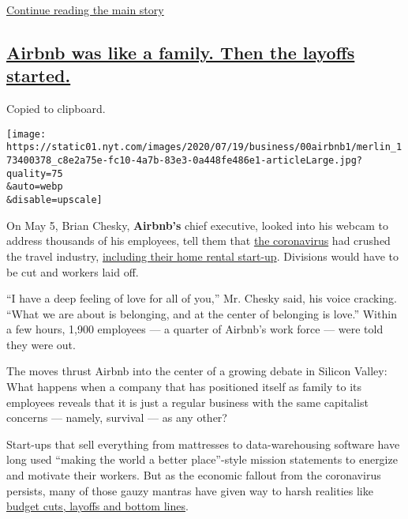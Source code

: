 \protect\hyperlink{after-dfp-ad-mid3}{Continue reading the main story}

\hypertarget{airbnb-was-like-a-family-then-the-layoffs-started}{%
\subsection{\texorpdfstring{\protect\hyperlink{airbnb-was-like-a-family-then-the-layoffs-started}{Airbnb
was like a family. Then the layoffs
started.}}{Airbnb was like a family. Then the layoffs started.}}\label{airbnb-was-like-a-family-then-the-layoffs-started}}

Copied to clipboard.

\texttt{[image: https://static01.nyt.com/images/2020/07/19/business/00airbnb1/merlin\_173400378\_c8e2a75e-fc10-4a7b-83e3-0a448fe486e1-articleLarge.jpg?quality=75\\\&auto=webp\\\&disable=upscale]}

On May 5, Brian Chesky, \textbf{Airbnb's} chief executive, looked into
his webcam to address thousands of his employees, tell them that
\href{https://www.nytimes.com/news-event/coronavirus?action=click\&pgtype=Article\&state=default\&module=styln-coronavirus\&variant=show\&region=TOP_BANNER\&context=storylines_menu}{the
coronavirus} had crushed the travel industry,
\href{https://www.nytimes.com/2020/03/10/technology/airbnb-hosts-coronavirus.html}{including
their home rental start-up}. Divisions would have to be cut and workers
laid off.

``I have a deep feeling of love for all of you,'' Mr. Chesky said, his
voice cracking. ``What we are about is belonging, and at the center of
belonging is love.'' Within a few hours, 1,900 employees --- a quarter
of Airbnb's work force --- were told they were out.

The moves thrust Airbnb into the center of a growing debate in Silicon
Valley: What happens when a company that has positioned itself as family
to its employees reveals that it is just a regular business with the
same capitalist concerns --- namely, survival --- as any other?

Start-ups that sell everything from mattresses to data-warehousing
software have long used ``making the world a better place''-style
mission statements to energize and motivate their workers. But as the
economic fallout from the coronavirus persists, many of those gauzy
mantras have given way to harsh realities like
\href{https://www.nytimes.com/2020/04/01/technology/virus-start-ups-pummeled-layoffs-unwinding.html}{budget
cuts, layoffs and bottom lines}.


